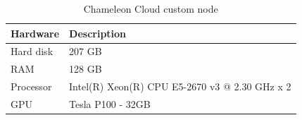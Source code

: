 \documentclass[12pt]{report}
\begin{document}
\begin{table}[htb]
	\centering
	\begin{tabular}{||M{3.0cm}|M{4.5cm}||}
		\hline
		\textbf{Hardware} 	& \textbf{Description} \\ \hline
		Hard disk           & 207 GB            \\ \hline
		RAM         		& 128 GB              \\ \hline
		Processor           & Intel(R) Xeon(R) CPU E5-2670 v3 @ 2.30 GHz x 2 \\ \hline
		GPU                 & Tesla P100 - 32GB              \\ \hline	
	\end{tabular}
	\caption{Chameleon Cloud custom node}\label{node_chameleon}
\end{table}
\end{document}
